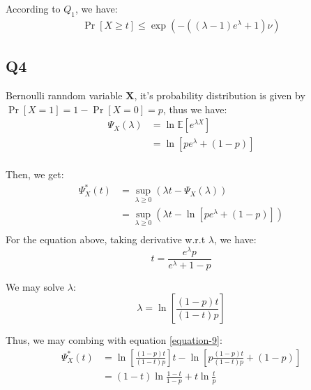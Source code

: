 \documentclass[a4paper, 12pt, titlepage]{article}
\begin{document}
According to $Q_1$, we have:
\begin{equation}
    \begin{aligned}
        \Pr \left[ X \geq t \right] \leq \exp \left( - \left( (\lambda - 1) e^{\lambda} + 1 \right) \nu  \right)
    \end{aligned}
\end{equation}


\subsection{Q4}
Bernoulli ranndom variable $\mathbf{X}$, it's probability distribution is given by $\Pr \left[ X = 1 \right] = 1 - \Pr \left[ X = 0 \right] = p $, thus we have:
\begin{equation}
    \begin{aligned}
        \Psi_{X}(\lambda) &= \ln \mathbb E \left[ e^{\lambda X} \right] \\
                          &= \ln \left[ p e^{\lambda} + (1 - p) \right] \\
    \end{aligned}
\end{equation}

Then, we get:
\begin{equation} \label{equation-9}
    \begin{aligned}
        \Psi_{X}^{*}(t) &= \sup_{\lambda \geq 0} \left( \lambda t - \Psi_{X}(\lambda) \right) \\
                       &= \sup_{\lambda \geq 0} \left( \lambda t - \ln \left[ p e^{\lambda} + (1 - p) \right] \right) \\
    \end{aligned}
\end{equation}
For the equation above, taking derivative w.r.t $\lambda$, we have:
\[
    t = \frac{ e^{\lambda} p }{ e^{\lambda} + 1 - p }
\]

We may solve $\lambda$:
\[
    \lambda = \ln \left[ \frac{ (1 - p) t }{ (1 - t) p } \right]
\]

Thus, we may combing with equation \ref{equation-9}:
\begin{equation}
    \begin{aligned}
        \Psi_{X}^{*}(t) &= \ln \left[ \frac{ (1 - p) t }{ (1 - t) p } \right] t - \ln \left[ p \frac{ (1 - p) t }{ (1 - t) p } + (1 - p) \right] \\
                        &= (1 - t) \ln \frac{ 1 - t }{1 - p} + t \ln \frac{t}{p}
    \end{aligned}
\end{equation}
\end{document}
